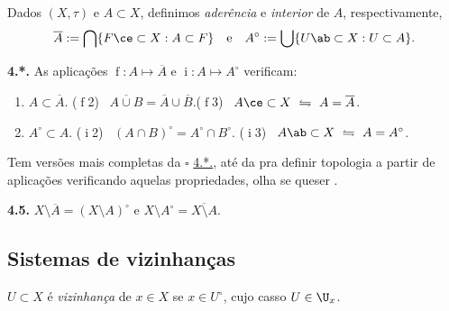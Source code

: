 \begin{definition}
    Dados \((X,\tau)\) e \(A\subset X\), definimos \emph{aderência} e \emph{interior} de \(A\), respectivamente, 
    \[\overline{A}:= \bigcap \{F\ce \subset X : A \subset F \} \text{ \ \ e \ \ } A^\circ := \bigcup \{U\ab \subset X : U \subset A\}.\]  
\end{definition}
\vspace{-0.2cm}
\hypertarget{prop4x}{}
\begin{proposition}
    \textbf{4.*.} As aplicações \(\operatorname{f}:  A \mapsto \overline{A}   \) e \(\operatorname{i} : A \mapsto A^\circ\) verificam: 
    \vspace{-0.2cm}
    \begin{enumerate}[label = (\(\operatorname{f}\)\arabic*), left = 0.75cm]
        \item \(A\subset \overline{A}\). \hfill (\(\operatorname{f}\)2) \ \(\overline{A\cup B} = \overline{A} \cup \overline{B}\).\hfill (\(\operatorname{f}\)3) \ \(A\ce\subset X \ \leftrightharpoons \ A = \overline{A}\)\hspace{0.1cm}.
        \item[(\(\operatorname{i}\)1)] \(A^\circ \subset A\). \hspace{1.65cm} (\(\operatorname{i}\)2) \ \((A \cap B)^\circ = A^\circ \cap B^\circ\).\hspace{1.1cm} (\(\operatorname{i}\)3) \ \(A\ab \subset X \ \leftrightharpoons \ A = A^\circ\).
    \end{enumerate}
\end{proposition}
\begin{note}
    Tem versões mais completas da \(\square\) \hyperlink{prop4x}{4.*.}, até da pra definir topologia a partir de aplicações verificando aquelas propriedades, olha se queser \cite[Pág. 9]{mujica2005}.  
\end{note}
\begin{proposition}
    \textbf{4.5.} \(X\setminus \overline{A} = (X \setminus A)^\circ\) e \( X\setminus A^\circ = \overline{X\setminus A}\). 
\end{proposition}

\subsection*{Sistemas de vizinhanças}

\begin{definition}
    \(U\subset X\) é \emph{vizinhança} de \(x \in X\) se \(x \in U^\circ\), cujo casso \( U \in \U_x\). 
\end{definition}

